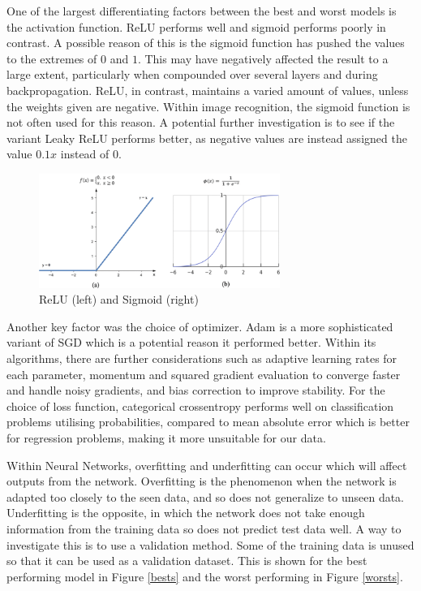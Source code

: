 \documentclass[a4paper,11pt]{article}
\theoremstyle{plain} %
\theoremstyle{definition} %
\theoremstyle{remark} %
\begin{document}
One of the largest differentiating factors between the best and worst models is the activation function. ReLU performs well and sigmoid performs poorly in contrast. A possible reason of this is the sigmoid function has pushed the values to the extremes of $0$ and $1$. This may have negatively affected the result to a large extent, particularly when compounded over several layers and during backpropagation. ReLU, in contrast, maintains a varied amount of values, unless the weights given are negative. Within image recognition, the sigmoid function is not often used for this reason. A potential further investigation is to see if the variant Leaky ReLU performs better, as negative values are instead assigned the value $0.1x$ instead of $0$.

\begin{figure}[h]
	\centering 
	\includegraphics[width=0.7\textwidth, angle=0]{a-ReLU-activation-function-b-Sigmoid-function.png}	
	\caption{ReLU (left) and Sigmoid (right) \citep{article}} 
	\label{best}%
\end{figure}

Another key factor was the choice of optimizer. Adam is a more sophisticated variant of SGD which is a potential reason it performed better. Within its algorithms, there are further considerations such as adaptive learning rates for each parameter, momentum and squared gradient evaluation to converge faster and handle noisy gradients, and bias correction to improve stability. For the choice of loss function, categorical crossentropy performs well on classification problems utilising probabilities, compared to mean absolute error which is better for regression problems, making it more unsuitable for our data. 

Within Neural Networks, overfitting and underfitting can occur which will affect outputs from the network. Overfitting is the phenomenon when the network is adapted too closely to the seen data, and so does not generalize
to unseen data. Underfitting is the opposite, in which the network does not take enough information from the training data so does not predict test data well. A way to investigate this is to use a validation method. Some of the training data is unused so that it can be used as a validation dataset. This is shown for the best performing model in Figure \cref{bests} and the worst performing in Figure \cref{worsts}.
\end{document}
